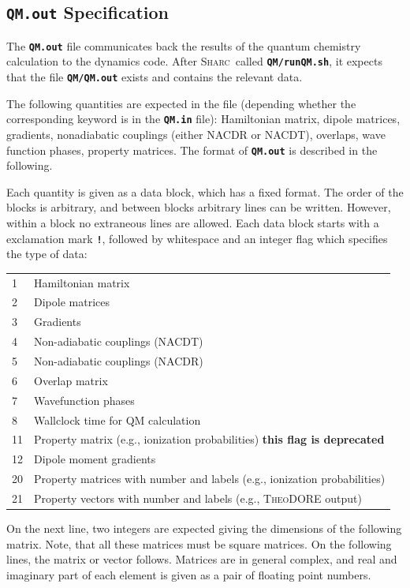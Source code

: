 \documentclass[a4paper,10pt,DIV=15,openany]{scrbook}
\newcommand{\sharc}{\textsc{Sharc}}
\newcommand{\ttt}[1]{\textbf{\texttt{#1}}}
\begin{document}
\subsection{\ttt{QM.out} Specification}\label{intf:qmout}

The \ttt{QM.out} file communicates back the results of the quantum chemistry calculation to the dynamics code. After \sharc\ called \ttt{QM/runQM.sh}, it expects that the file \ttt{QM/QM.out} exists and contains the relevant data.

The following quantities are expected in the file (depending whether the corresponding keyword is in the \ttt{QM.in} file): Hamiltonian matrix, dipole matrices, gradients, nonadiabatic couplings (either NACDR or NACDT), overlaps, wave function phases, property matrices. The format of \ttt{QM.out} is described in the following. 

Each quantity is given as a data block, which has a fixed format. The order of the blocks is arbitrary, and between blocks arbitrary lines can be written. However, within a block no extraneous lines are allowed. Each data block starts with a exclamation mark \ttt{!}, followed by whitespace and an integer flag which specifies the type of data:

\begin{tabular}{ll}
1       &Hamiltonian matrix\\
2       &Dipole matrices\\
3       &Gradients\\
4       &Non-adiabatic couplings (NACDT)\\
5       &Non-adiabatic couplings (NACDR)\\
6       &Overlap matrix\\
7       &Wavefunction phases\\
8       &Wallclock time for QM calculation\\
11      &Property matrix (e.g., ionization probabilities) \quad \textbf{this flag is deprecated}\\
12      &Dipole moment gradients\\
20      &Property matrices with number and labels (e.g., ionization probabilities)\\
21      &Property vectors with number and labels (e.g., \textsc{TheoDORE} output)
\end{tabular}

On the next line, two integers are expected giving the dimensions of the following matrix. Note, that all these matrices must be square matrices. On the following lines, the matrix or vector follows. Matrices are in general complex, and real and imaginary part of each element is given as a pair of floating point numbers.
\end{document}
